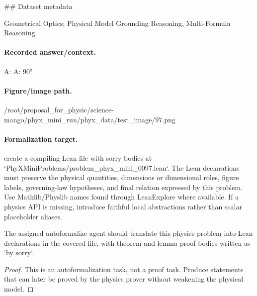 \#\# Dataset metadata

Geometrical Optics; Physical Model Grounding Reasoning, Multi-Formula Reasoning

\paragraph{Recorded answer/context.}
A: A:  90°

\paragraph{Figure/image path.}
/root/proposal\_for\_physic/science-mango/phyx\_mini\_run/phyx\_data/test\_image/97.png

\paragraph{Formalization target.}
create a compiling Lean file with sorry bodies at `PhyXMiniProblems/problem\_phyx\_mini\_0097.lean`. The Lean declarations must preserve the physical quantities, dimensions or dimensional roles, figure labels, governing-law hypotheses, and final relation expressed by this problem.
Use Mathlib/Physlib names found through LeanExplore where available. If a physics API is missing, introduce faithful local abstractions rather than scalar placeholder aliases.

\begin{theorem}
\label{thm:physics:phyx_mini_0097:target}
The assigned autoformalize agent should translate this physics problem into Lean declarations in the covered file, with theorem and lemma proof bodies written as `by sorry`.
\end{theorem}
\begin{proof}
This is an autoformalization task, not a proof task. Produce statements that can later be proved by the physics prover without weakening the physical model.
\end{proof}

